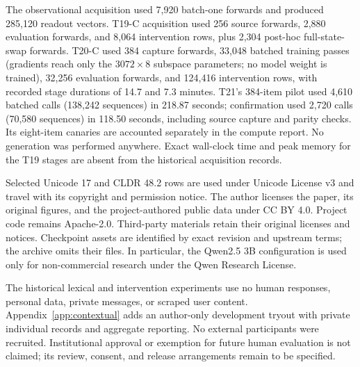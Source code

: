 \documentclass{article}
\begin{document}
The observational acquisition used 7,920 batch-one forwards and produced
285,120 readout vectors. T19-C acquisition used 256 source forwards, 2,880
evaluation forwards, and 8,064 intervention rows, plus 2,304 post-hoc full-state-swap
forwards. T20-C used 384 capture forwards, 33,048 batched training passes
(gradients reach only the $3072\times8$ subspace parameters; no model weight
is trained), 32,256 evaluation forwards, and 124,416 intervention rows, with
recorded stage durations of 14.7 and 7.3 minutes. T21's 384-item pilot used
4,610 batched calls (138,242 sequences) in 218.87 seconds; confirmation used
2,720 calls (70,580 sequences) in 118.50 seconds, including source capture and
parity checks. Its eight-item canaries are accounted separately in the
compute report. No generation was performed anywhere. Exact wall-clock time and peak memory for the T19 stages
are absent from the historical acquisition records.

Selected Unicode 17 and CLDR 48.2 rows are used under Unicode License v3 and
travel with its copyright and permission notice. The author licenses the
paper, its original figures, and the project-authored public data under
CC BY 4.0. Project code remains Apache-2.0. Third-party materials retain
their original licenses and notices. Checkpoint assets are identified by exact revision and upstream
terms; the archive omits their files. In particular, the Qwen2.5 3B configuration
is used only for non-commercial research under the Qwen Research License.

The historical lexical and intervention experiments use no human responses,
personal data, private messages, or scraped user content. Appendix~\ref{app:contextual}
adds an author-only development tryout with private individual records and
aggregate reporting. No external participants were recruited. Institutional
approval or exemption for future human evaluation is not claimed; its review,
consent, and release arrangements remain to be specified.

\end{document}
